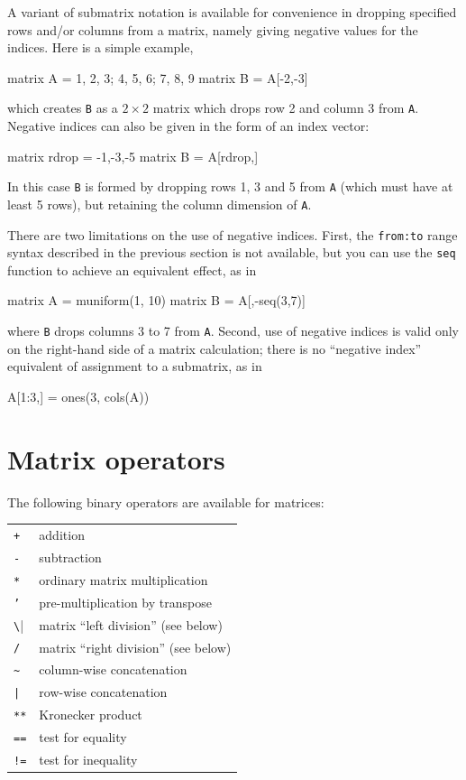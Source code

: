 A variant of submatrix notation is available for convenience in
dropping specified rows and/or columns from a matrix, namely giving
negative values for the indices. Here is a simple example,
%
\begin{code}
matrix A = {1, 2, 3; 4, 5, 6; 7, 8, 9}
matrix B = A[-2,-3]
\end{code}
%
which creates \texttt{B} as a $2\times 2$ matrix which drops row 2 and
column 3 from \texttt{A}. Negative indices can also be given in the
form of an index vector:
%
\begin{code}
matrix rdrop = {-1,-3,-5}
matrix B = A[rdrop,]
\end{code}
%
In this case \texttt{B} is formed by dropping rows 1, 3 and 5 from
\texttt{A} (which must have at least 5 rows), but retaining the column
dimension of \texttt{A}.

There are two limitations on the use of negative indices. First, the
\texttt{from:to} range syntax described in the previous section is not
available, but you can use the \texttt{seq} function to achieve an
equivalent effect, as in
%
\begin{code}
matrix A = muniform(1, 10)
matrix B = A[,-seq(3,7)]
\end{code}
%
where \texttt{B} drops columns 3 to 7 from \texttt{A}. Second, use of
negative indices is valid only on the right-hand side of a matrix
calculation; there is no ``negative index'' equivalent of assignment
to a submatrix, as in
%
\begin{code}
A[1:3,] = ones(3, cols(A))
\end{code}

\section{Matrix operators}
\label{matrix-op}

The following binary operators are available for matrices:

\begin{center}
\begin{tabular}{ll}
\texttt{+}  & addition \\
\texttt{-}  & subtraction \\
\texttt{*}  & ordinary matrix multiplication \\
\texttt{'}  & pre-multiplication by transpose \\
\verb|\|    & matrix ``left division'' (see below) \\
\texttt{/}  & matrix ``right division'' (see below) \\
\verb+~+    & column-wise concatenation \\
\verb+|+    & row-wise concatenation \\
\texttt{**} & Kronecker product \\
\texttt{==}  & test for equality \\
\texttt{!=} & test for inequality
\end{tabular}
\end{center}

